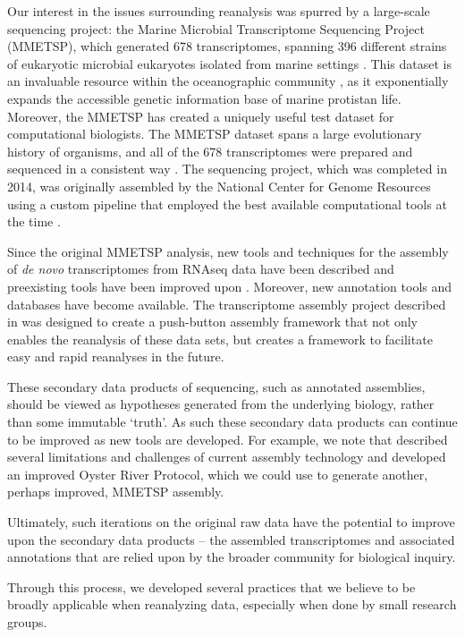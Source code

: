 \documentclass[a4paper,num-refs]{oup-contemporary}
\begin{document}
Our interest in the issues surrounding reanalysis was spurred by a large-scale sequencing project: the Marine Microbial Transcriptome Sequencing Project (MMETSP), which generated 678 transcriptomes, spanning 396 different strains of eukaryotic microbial eukaryotes isolated from marine settings \cite{Caron2016}. This dataset is an invaluable resource within the oceanographic community \cite{Keeling2014, Caron2016}, as it exponentially expands the accessible genetic information base of marine protistan life. Moreover, the MMETSP has created a uniquely useful test dataset for computational biologists. The MMETSP dataset spans a large evolutionary history of organisms, and all of the 678 transcriptomes were prepared and sequenced in a consistent way \cite{Keeling2014}. The sequencing project, which was completed in 2014, was originally assembled by the National Center for Genome Resources using a custom pipeline that employed the best available computational tools at the time \cite{Simpson2009, Huang1999}.

Since the original MMETSP analysis, new tools and techniques for the assembly of {\em de novo} transcriptomes from RNAseq data have been described and preexisting tools have been improved upon \cite{Grabherr2011}. Moreover, new annotation tools and databases have become available. The transcriptome assembly project described in \citet{Johnson2018} was designed to create a push-button assembly framework that not only enables the reanalysis of these data sets, but creates a framework to facilitate easy and rapid reanalyses in the future.

These secondary data products of sequencing, such as annotated
assemblies, should be viewed as hypotheses generated from the
underlying biology, rather than some immutable `truth'. As such these
secondary data products can continue to be improved as new tools are
developed.  For example, we note that \citet{MacManes177253} described several
limitations and challenges of current assembly technology and developed
an improved Oyster River Protocol, which we could use to generate another,
perhaps improved, MMETSP assembly.

Ultimately, such iterations on the original raw data have the
potential to improve upon the secondary data products -- the assembled
transcriptomes and associated annotations that are relied upon by the
broader community for biological inquiry.

Through this process, we developed several practices that we believe
to be broadly applicable when reanalyzing data, especially when done
by small research groups.
\end{document}
